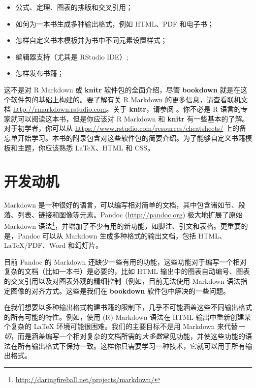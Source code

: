\documentclass[
  12pt,
]{krantz}
\providecommand{\tightlist}{%
  \setlength{\itemsep}{0pt}\setlength{\parskip}{0pt}}
\renewcommand{\href}[2]{#2\footnote{\url{#1}}}
\theoremstyle{definition}
\theoremstyle{definition}
\theoremstyle{definition}
\theoremstyle{definition}
\theoremstyle{remark}
\begin{document}
\begin{itemize}
\tightlist
\item
  公式、定理、图表的排版和交叉引用；
\item
  如何为一本书生成多种输出格式，例如 HTML、PDF 和电子书；
\item
  怎样自定义书本模板并为书中不同元素设置样式；
\item
  编辑器支持（尤其是 RStudio IDE）;
\item
  怎样发布书籍；
\end{itemize}

这不是对 R Markdown 或 \textbf{knitr} 软件包\citep{R-knitr}的全面介绍，尽管 \textbf{bookdown} 就是在这个软件包的基础上构建的。要了解有关 R Markdown 的更多信息，请查看联机文档 \url{http://rmarkdown.rstudio.com}。关于 \textbf{knitr}，请参阅 \citet{xie2015}。你不必是 R 语言\citep{R-base}的专家就可以阅读这本书，但是你应该对 R Markdown 和 \textbf{knitr} 有一些基本的了解。对于初学者，你可以从 \url{https://www.rstudio.com/resources/cheatsheets/} 上的备忘单开始学习。本书的附录包含对这些软件包的简要介绍。为了能够自定义书籍模板和主题，你应该熟悉 LaTeX、HTML 和 CSS。

\hypertarget{ux5f00ux53d1ux52a8ux673a}{%
\section{开发动机}\label{ux5f00ux53d1ux52a8ux673a}}

Markdown 是一种很好的语言，可以编写相对简单的文档，其中包含诸如节、段落、列表、链接和图像等元素。Pandoc (\url{http://pandoc.org}) 极大地扩展了\href{http://daringfireball.net/projects/markdown/}{原始 Markdown 语法}，并增加了不少有用的新功能，如脚注、引文和表格。更重要的是，Pandoc 可以从 Markdown 生成多种格式的输出文档，包括 HTML、LaTeX/PDF、Word 和幻灯片。

目前 Pandoc 的 Markdown 还缺少一些有用的功能，这些功能对于编写一个相对复杂的文档（比如一本书）是必要的，比如 HTML 输出中的图表自动编号、图表的交叉引用以及对图表外观的精细控制（例如，目前无法使用 Markdown 语法指定图像的对齐方式。这些是我们在 \textbf{bookdown} 软件包中解决的一些问题。

在我们想要以多种输出格式构建书籍的限制下，几乎不可能涵盖这些不同输出格式的所有可能的特性。例如，使用 (R) Markdown 语法在 HTML 输出中重新创建某个复杂的 LaTeX 环境可能很困难。我们的主要目标不是用 Markdown 来代替\emph{一切}，而是涵盖编写一个相对复杂的文档所需的\emph{大多数}常见功能，并使这些功能的语法在所有输出格式下保持一致。这样你只需要学习一种技术，它就可以用于所有输出格式。
\end{document}
